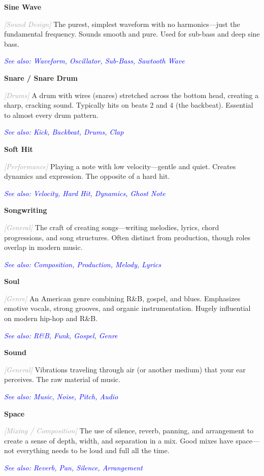 \documentclass[11pt,letterpaper]{article}
\newcommand{\term}[1]{\textbf{\large\color{purple}#1}}
\newcommand{\category}[1]{\textcolor{darkgray}{\textit{\small [#1]}}}
\newcommand{\seealso}[1]{\textcolor{blue}{\textit{See also: #1}}}
\newenvironment{termdef}[1]
  {\noindent\term{#1}\par\nopagebreak}
  {\par\vspace{0.3em}}
\begin{document}
\begin{termdef}{Sine Wave}
\category{Sound Design}
The purest, simplest waveform with no harmonics—just the fundamental frequency. Sounds smooth and pure. Used for sub-bass and deep sine bass.

\seealso{Waveform, Oscillator, Sub-Bass, Sawtooth Wave}
\end{termdef}

\begin{termdef}{Snare / Snare Drum}
\category{Drums}
A drum with wires (snares) stretched across the bottom head, creating a sharp, cracking sound. Typically hits on beats 2 and 4 (the backbeat). Essential to almost every drum pattern.

\seealso{Kick, Backbeat, Drums, Clap}
\end{termdef}

\begin{termdef}{Soft Hit}
\category{Performance}
Playing a note with low velocity—gentle and quiet. Creates dynamics and expression. The opposite of a hard hit.

\seealso{Velocity, Hard Hit, Dynamics, Ghost Note}
\end{termdef}

\begin{termdef}{Songwriting}
\category{General}
The craft of creating songs—writing melodies, lyrics, chord progressions, and song structures. Often distinct from production, though roles overlap in modern music.

\seealso{Composition, Production, Melody, Lyrics}
\end{termdef}

\begin{termdef}{Soul}
\category{Genre}
An American genre combining R\&B, gospel, and blues. Emphasizes emotive vocals, strong grooves, and organic instrumentation. Hugely influential on modern hip-hop and R\&B.

\seealso{R\&B, Funk, Gospel, Genre}
\end{termdef}

\begin{termdef}{Sound}
\category{General}
Vibrations traveling through air (or another medium) that your ear perceives. The raw material of music.

\seealso{Music, Noise, Pitch, Audio}
\end{termdef}

\begin{termdef}{Space}
\category{Mixing / Composition}
The use of silence, reverb, panning, and arrangement to create a sense of depth, width, and separation in a mix. Good mixes have space—not everything needs to be loud and full all the time.

\seealso{Reverb, Pan, Silence, Arrangement}
\end{termdef}
\end{document}
